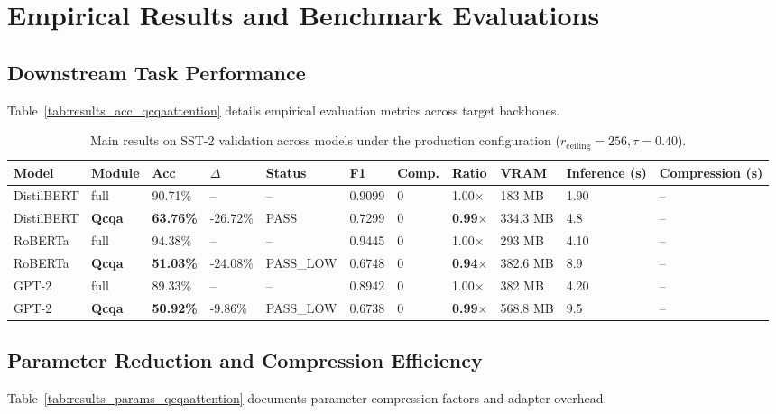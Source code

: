 \section{Empirical Results and Benchmark Evaluations}

\subsection{Downstream Task Performance}
Table~\ref{tab:results_acc_qcqaattention} details empirical evaluation metrics across target backbones.

\begin{table}[t]
\centering
\small
\begin{tabular}{lllllllllll}
\toprule
\textbf{Model} & \textbf{Module} & \textbf{Acc} & \textbf{$\Delta$} & \textbf{Status} & \textbf{F1} & \textbf{Comp.} & \textbf{Ratio} & \textbf{VRAM} & \textbf{Inference (s)} & \textbf{Compression (s)} \\
\midrule
DistilBERT & full & 90.71\% & -- & -- & 0.9099 & 0 & 1.00$\times$ & 183 MB & 1.90 & -- \\
DistilBERT & \textbf{Qcqa} & \textbf{63.76\%} & -26.72\% & PASS & 0.7299 & 0 & \textbf{0.99$\times$} & 334.3 MB & 4.8 & -- \\
RoBERTa & full & 94.38\% & -- & -- & 0.9445 & 0 & 1.00$\times$ & 293 MB & 4.10 & -- \\
RoBERTa & \textbf{Qcqa} & \textbf{51.03\%} & -24.08\% & PASS_LOW & 0.6748 & 0 & \textbf{0.94$\times$} & 382.6 MB & 8.9 & -- \\
GPT-2 & full & 89.33\% & -- & -- & 0.8942 & 0 & 1.00$\times$ & 382 MB & 4.20 & -- \\
GPT-2 & \textbf{Qcqa} & \textbf{50.92\%} & -9.86\% & PASS_LOW & 0.6738 & 0 & \textbf{0.99$\times$} & 568.8 MB & 9.5 & -- \\
\bottomrule
\end{tabular}
\caption{Main results on SST-2 validation across models under the production configuration ($r_{\mathrm{ceiling}}=256, \tau=0.40$).}
\label{tab:main_sst2}
\end{table}

\subsection{Parameter Reduction and Compression Efficiency}
Table~\ref{tab:results_params_qcqaattention} documents parameter compression factors and adapter overhead.

